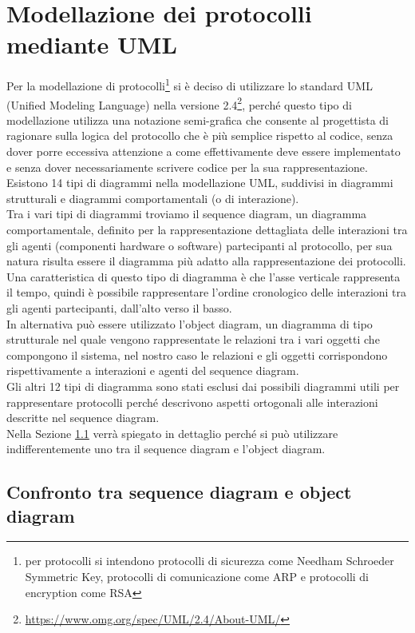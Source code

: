 \section{Modellazione dei protocolli mediante UML}

Per la modellazione di protocolli\footnote{per protocolli si intendono protocolli di sicurezza come Needham Schroeder Symmetric Key, protocolli di comunicazione come ARP e protocolli di encryption come RSA} si è deciso di utilizzare lo standard UML (Unified Modeling Language) nella versione 2.4\footnote{\url{https://www.omg.org/spec/UML/2.4/About-UML/}}, perch\'e questo tipo di modellazione utilizza una notazione semi-grafica che consente al progettista di ragionare sulla logica del protocollo che \`e pi\`u semplice rispetto al codice, senza dover porre eccessiva attenzione a come effettivamente deve essere implementato e senza dover necessariamente scrivere codice per la sua rappresentazione.\\  
Esistono 14 tipi di diagrammi nella modellazione UML, suddivisi in diagrammi strutturali e diagrammi comportamentali (o di interazione).\\ 
Tra i vari tipi di diagrammi troviamo il sequence diagram, un diagramma comportamentale, definito per la rappresentazione dettagliata delle interazioni tra gli agenti (componenti hardware o software) partecipanti al protocollo, per sua natura risulta essere il diagramma più adatto alla rappresentazione dei protocolli.\\ 
Una caratteristica di questo tipo di diagramma è che l'asse verticale rappresenta il tempo, quindi è possibile rappresentare l'ordine cronologico delle interazioni tra gli agenti partecipanti, dall'alto verso il basso.\\
In alternativa può essere utilizzato l'object diagram, un diagramma di tipo strutturale nel quale vengono rappresentate le relazioni tra i vari oggetti che compongono il sistema, nel nostro caso le relazioni e gli oggetti corrispondono rispettivamente a interazioni e agenti del sequence diagram.\\
Gli altri 12 tipi di diagramma sono stati esclusi dai possibili diagrammi utili per rappresentare protocolli perch\'e descrivono aspetti ortogonali alle interazioni descritte nel sequence diagram.\\
Nella Sezione \ref{sub:con} verrà spiegato in dettaglio perch\'e si può utilizzare indifferentemente uno tra il sequence diagram e l'object diagram.

\subsection{Confronto tra sequence diagram e object diagram}\label{sub:con}

